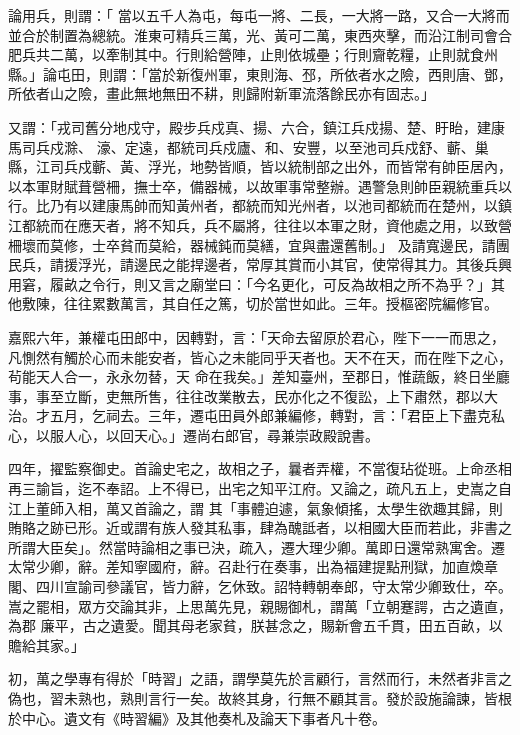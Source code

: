 \begin{pinyinscope}
 論用兵，則謂：「
 當以五千人為屯，每屯一將、二長，一大將一路，又合一大將而並合於制置為總統。淮東可精兵三萬，光、黃可二萬，東西夾擊，而沿江制司會合肥兵共二萬，以牽制其中。行則給營陣，止則依城壘；行則齎乾糧，止則就食州縣。」論屯田，則謂：「當於新復州軍，東則海、邳，所依者水之險，西則唐、鄧，所依者山之險，畫此無地無田不耕，則歸附新軍流落餘民亦有固志。」



 又謂：「戎司舊分地戍守，殿步兵戍真、揚、六合，鎮江兵戍揚、楚、盱眙，建康馬司兵戍滁、
 濠、定遠，都統司兵戍廬、和、安豐，以至池司兵戍舒、蘄、巢縣，江司兵戍蘄、黃、浮光，地勢皆順，皆以統制部之出外，而皆常有帥臣居內，以本軍財賦葺營柵，撫士卒，備器械，以故軍事常整辦。遇警急則帥臣親統重兵以行。比乃有以建康馬帥而知黃州者，都統而知光州者，以池司都統而在楚州，以鎮江都統而在應天者，將不知兵，兵不屬將，往往以本軍之財，資他處之用，以致營柵壞而莫修，士卒貧而莫給，器械鈍而莫繕，宜與盡還舊制。」
 及請寬邊民，請團民兵，請援浮光，請邊民之能捍邊者，常厚其賞而小其官，使常得其力。其後兵興用窘，履畝之令行，則又言之廟堂曰：「今名更化，可反為故相之所不為乎？」其他敷陳，往往累數萬言，其自任之篤，切於當世如此。三年。授樞密院編修官。



 嘉熙六年，兼權屯田郎中，因轉對，言：「天命去留原於君心，陛下一一而思之，凡惻然有觸於心而未能安者，皆心之未能同乎天者也。天不在天，而在陛下之心，茍能天人合一，永永勿替，天
 命在我矣。」差知臺州，至郡日，惟蔬飯，終日坐廳事，事至立斷，吏無所售，往往改業散去，民亦化之不復訟，上下肅然，郡以大治。才五月，乞祠去。三年，遷屯田員外郎兼編修，轉對，言：「君臣上下盡克私心，以服人心，以回天心。」遷尚右郎官，尋兼崇政殿說書。



 四年，擢監察御史。首論史宅之，故相之子，曩者弄權，不當復玷從班。上命丞相再三諭旨，迄不奉詔。上不得已，出宅之知平江府。又論之，疏凡五上，史嵩之自江上董師入相，萬又首論之，謂
 其「事體迫遽，氣象傾搖，太學生欲趣其歸，則賄賂之跡已形。近或謂有族人發其私事，肆為醜詆者，以相國大臣而若此，非書之所謂大臣矣」。然當時論相之事已決，疏入，遷大理少卿。萬即日還常熟寓舍。遷太常少卿，辭。差知寧國府，辭。召赴行在奏事，出為福建提點刑獄，加直煥章閣、四川宣諭司參議官，皆力辭，乞休致。詔特轉朝奉郎，守太常少卿致仕，卒。嵩之罷相，眾方交論其非，上思萬先見，親賜御札，謂萬「立朝蹇諤，古之遺直，為郡
 廉平，古之遺愛。聞其母老家貧，朕甚念之，賜新會五千貫，田五百畝，以贍給其家。」



 初，萬之學專有得於「時習」之語，謂學莫先於言顧行，言然而行，未然者非言之偽也，習未熟也，熟則言行一矣。故終其身，行無不顧其言。發於設施論諫，皆根於中心。遺文有《時習編》及其他奏札及論天下事者凡十卷。




\end{pinyinscope}
